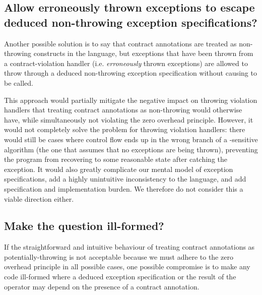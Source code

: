 \subsection{Allow erroneously thrown exceptions to escape deduced non-throwing exception specifications?}

Another possible solution is to say that contract annotations are treated as non-throwing constructs in the language, but exceptions that have been thrown from a contract-violation handler (i.e. \emph{erroneously} thrown exceptions) are allowed to throw through a deduced non-throwing exception specification without causing  to be called.

This approach would partially mitigate the negative impact on throwing violation handlers that treating contract annotations as non-throwing would otherwise have, while simultaneously not violating the zero overhead principle. However, it would not completely solve the problem for throwing violation handlers: there would still be cases where control flow ends up in the wrong branch of a -sensitive algorithm (the one that assumes that no exceptions are being thrown), preventing the program from recovering to some reasonable state after catching the exception. It would also greatly complicate our mental model of exception specifications, add a highly unintuitive inconsistency to the language, and add specification and implementation burden. We therefore do not consider this a viable direction either.

\subsection{Make the question ill-formed?}

If the straightforward and intuitive behaviour of treating contract annotations as potentially-throwing is not acceptable because we must adhere to the zero overhead principle in all possible cases, one possible compromise is to make any code ill-formed where a deduced exception specification or the result of the  operator may depend on the presence of a contract annotation.

